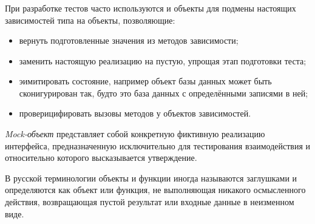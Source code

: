 \subsubsection{}
\label{sec:testing:unit:mock}

При разработке тестов часто используются \mock и \stub объекты для подмены настоящих зависимостей типа на объекты, позволяющие:

\begin{itemize}
	\item вернуть подготовленные значения из методов зависимости;
	\item заменить настоящую реализацию на пустую, упрощая этап подготовки теста;
	\item эимитировать состояние, например \stub объект базы данных может быть сконигурирован так, будто это база данных с определёнными записями в ней;
	\item проверицифировать вызовы методов у объектов зависимостей.
\end{itemize}

\textit{Mock-объект} представляет собой конкретную фиктивную реализацию интерфейса, предназначенную исключительно для тестирования взаимодействия и относительно которого высказывается утверждение. \cite{wiki:mock}

В русской терминологии \stub объекты и функции иногда называются заглушками и определяются как объект или функция, не выполняющая никакого осмысленного действия, возвращающая пустой результат или входные данные в неизменном виде. \cite{wiki:stub}